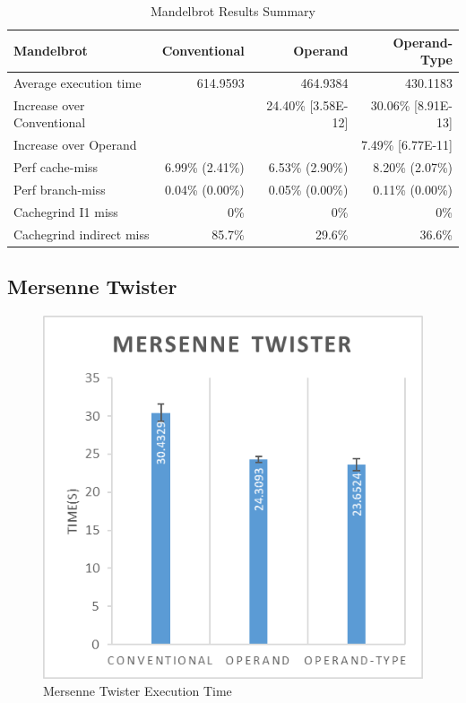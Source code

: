 \documentclass[english,a4paper,12pt]{report}
\begin{document}
\begin{table}[!htb]
  \begin{center}
    \begin{tabular}{lrrr}
      Mandelbrot & Conventional & Operand & Operand-Type\\
      \hline
      Average execution time & 614.9593 & 464.9384 & 430.1183\\
      Increase over Conventional &  & 24.40\% [3.58E-12] & 30.06\% [8.91E-13]\\
      Increase over Operand &  &  & 7.49\% [6.77E-11]\\
      Perf cache-miss & 6.99\% (2.41\%) & 6.53\% (2.90\%) & 8.20\% (2.07\%)\\
      Perf branch-miss & 0.04\% (0.00\%) & 0.05\% (0.00\%) & 0.11\% (0.00\%)\\
      Cachegrind I1 miss & 0\% & 0\% & 0\%\\
      Cachegrind indirect miss & 85.7\% & 29.6\% & 36.6\%\\
    \end{tabular}
  \end{center}
  \caption{Mandelbrot Results Summary}
\end{table}
\newpage
\subsection{Mersenne Twister}

\begin{figure}[!htb]
  \centering
  \includegraphics{mersenne.png}
  \caption{Mersenne Twister Execution Time}
  \label{fig:mersenne-time}
\end{figure}
\end{document}
